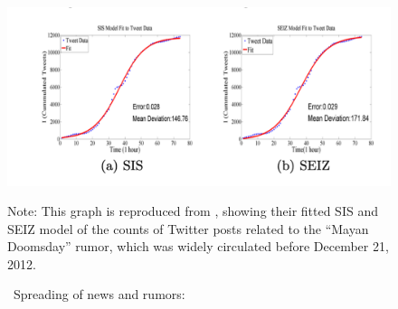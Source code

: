 	\begin{figure}[!ht] \centering  %
		\caption{ ~Spreading of news and rumors: \href{https://people.cs.vt.edu/ramakris/papers/news-rumor-epi-snakdd13.pdf}{\cite{jin2013epidemiological}}}
		\label{fig:news_curve}
		\centerline{\includegraphics[width=\textwidth]{./figures/Doomsday}}
		\begin{flushleft}{\footnotesize Note: This graph is reproduced from \cite{jin2013epidemiological}, showing their fitted SIS and SEIZ model of the counts of Twitter posts related to the ``Mayan Doomsday'' rumor, which was widely circulated before December 21, 2012.}
		\end{flushleft}
	\end{figure}
